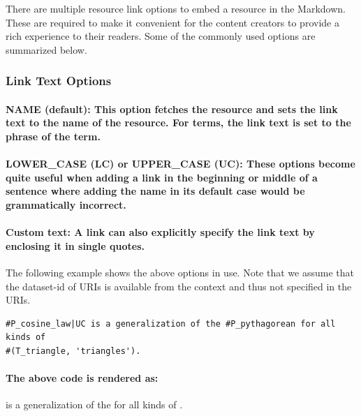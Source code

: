 \documentclass[a4paper]{article}
\begin{document}
There are multiple resource link options to embed a resource in the Markdown. These are required to make it convenient for the content creators to provide a rich experience to their readers. Some of the commonly used options are summarized below.

\subsubsection{Link Text Options}

\paragraph{\textbf{NAME} (default): This option fetches the resource and sets the link text to the name of the resource. For terms, the link text is set to the phrase of the term.}

\paragraph{\textbf{LOWER\_CASE (LC) or UPPER\_CASE (UC)}: These options become quite useful when adding a link in the beginning or middle of a sentence where adding the name in its default case would be grammatically incorrect.}

\paragraph{\textbf{Custom text}: A link can also explicitly specify the link text by enclosing it in single quotes.}

The following example shows the above options in use. Note that we assume that the dataset-id of URIs is available from the context and thus not specified in the URIs.

\begin{verbatim}
#P_cosine_law|UC is a generalization of the #P_pythagorean for all kinds of
#(T_triangle, 'triangles').
\end{verbatim}

\paragraph{The above code is rendered as:}
\begin{mdframed}
 is a generalization of the  for all kinds of .
\end{mdframed}
\end{document}
